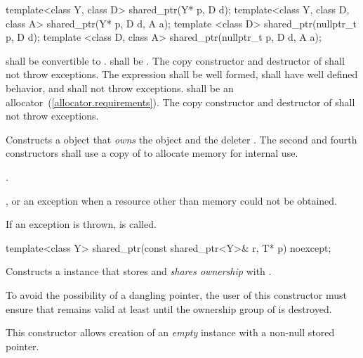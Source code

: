 %
\begin{itemdecl}
template<class Y, class D> shared_ptr(Y* p, D d);
template<class Y, class D, class A> shared_ptr(Y* p, D d, A a);
template <class D> shared_ptr(nullptr_t p, D d);
template <class D, class A> shared_ptr(nullptr_t p, D d, A a);
\end{itemdecl}

\begin{itemdescr}
\pnum\requires  {} shall be convertible to .  shall be
. The copy constructor and destructor of 
shall not throw exceptions. The expression  shall be
well formed, shall have well defined behavior, and shall not throw exceptions.
 shall be an allocator~(\ref{allocator.requirements}).
The copy constructor and destructor of  shall not throw exceptions.

\pnum\effects  Constructs a  object that \textit{owns} the
object  and the deleter .
The second and fourth constructors shall use a copy of  to
allocate memory for internal use.

\pnum\postconditions  {}.

\pnum\throws  {}, or an  exception
when a resource other than memory could not be obtained.

\pnum\exceptionsafety  If an exception is thrown,  is called.
\end{itemdescr}

%
\begin{itemdecl}
template<class Y> shared_ptr(const shared_ptr<Y>& r, T* p) noexcept;
\end{itemdecl}

\begin{itemdescr}
\pnum
\effects Constructs a  instance that
stores  and \textit{shares ownership} with .

\pnum
\postconditions {}

\pnum
\enternote To avoid the possibility of a dangling pointer, the
user of this constructor must ensure that  remains valid at
least until the ownership group of  is destroyed. \exitnote

\pnum
\enternote This constructor allows creation of an \textit{empty}
 instance with a non-null stored pointer. \exitnote
\end{itemdescr}

